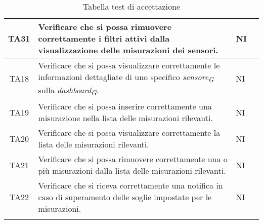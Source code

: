\begin{longtable}{|c|p{5cm}|p{2cm}|c|}
    \hline
    TA31 & Verificare che si possa rimuovere correttamente i filtri attivi dalla visualizzazione delle misurazioni dei sensori. & NI \\
    \hline
    TA18 & Verificare che si possa visualizzare correttamente le informazioni dettagliate di uno specifico \textit{sensore}\textsubscript{\textit{G}} sulla \textit{dashboard}\textsubscript{\textit{G}}. & NI \\
    \hline
    TA19 & Verificare che si possa inserire correttamente una misurazione nella lista delle misurazioni rilevanti. & NI \\
    \hline
    TA20 & Verificare che si possa visualizzare correttamente la lista delle misurazioni rilevanti. & NI \\
    \hline
    TA21 & Verificare che si possa rimuovere correttamente una o più misurazioni dalla lista delle misurazioni rilevanti. & NI \\
    \hline
    TA22 & Verificare che si riceva correttamente una notifica in caso di superamento delle soglie impostate per le misurazioni.
    & NI \\
    \hline
    \caption{Tabella test di accettazione}
    
    \end{longtable}





